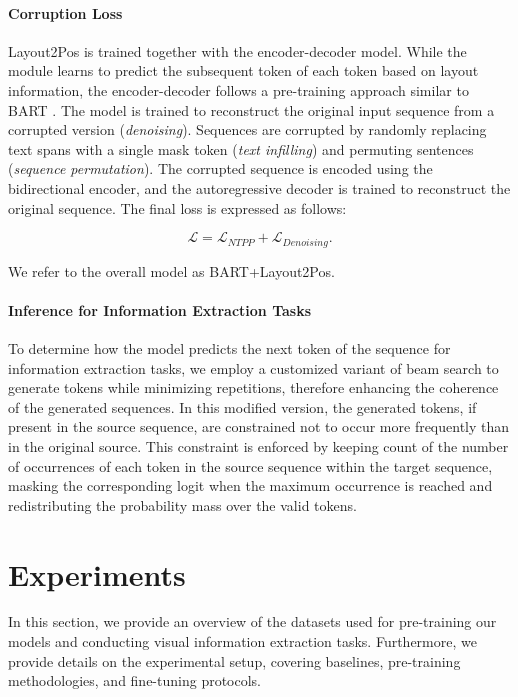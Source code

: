 \paragraph{Corruption Loss} Layout2Pos is trained together with the encoder-decoder model. While the module learns to predict the subsequent token of each token based on layout information, the encoder-decoder follows a pre-training approach similar to \ac{BART} \citep{lewis2019bart}. The model is trained to reconstruct the original input sequence from a corrupted version (\textit{denoising}). Sequences are corrupted by randomly replacing text spans with a single mask token (\textit{text infilling}) and permuting sentences (\textit{sequence permutation}). The corrupted sequence is encoded using the bidirectional encoder, and the autoregressive decoder is trained to reconstruct the original sequence. The final loss is expressed as follows:

\begin{equation}
  \mathcal{L} = \mathcal{L}_{NTPP} + \mathcal{L}_{Denoising}.
\end{equation}

\noindent We refer to the overall model as BART+Layout2Pos. 


\paragraph{Inference for Information Extraction Tasks} To determine how the model predicts the next token of the sequence for information extraction tasks, we employ a customized variant of beam search to generate tokens while minimizing repetitions, therefore enhancing the coherence of the generated sequences. In this modified version, the generated tokens, if present in the source sequence, are constrained not to occur more frequently than in the original source. This constraint is enforced by keeping count of the number of occurrences of each token in the source sequence within the target sequence, masking the corresponding logit when the maximum occurrence is reached and redistributing the probability mass over the valid tokens. 


\section{Experiments}

In this section, we provide an overview of the datasets used for pre-training our models and conducting visual information extraction tasks. Furthermore, we provide details on the experimental setup, covering baselines, pre-training methodologies, and fine-tuning protocols. 

